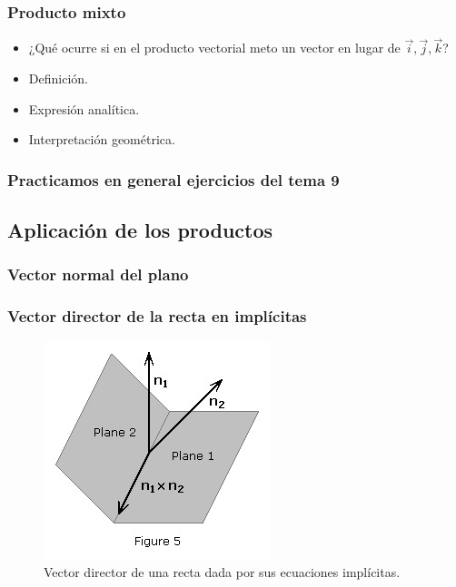 \subsubsection{Producto mixto}

\begin{itemize}
  \item ¿Qué ocurre si en el producto vectorial meto un vector en lugar de $\vec{i},\vec{j},\vec{k}$?
  \item Definición.
  \item Expresión analítica.
  \item Interpretación geométrica. 
\end{itemize}

\subsubsection{Practicamos en general ejercicios del tema 9}

\subsection{Aplicación de los productos}

\subsubsection{Vector normal del plano}

\subsubsection{Vector director de la recta en implícitas}

\begin{figure}[hbtp]
\centering
\includegraphics{img/directorrectaimplicitas.jpg}
\caption{Vector director de una recta dada por sus ecuaciones implícitas.}
\label{fig::vectordirectorrectaimplicitas}
\end{figure}

